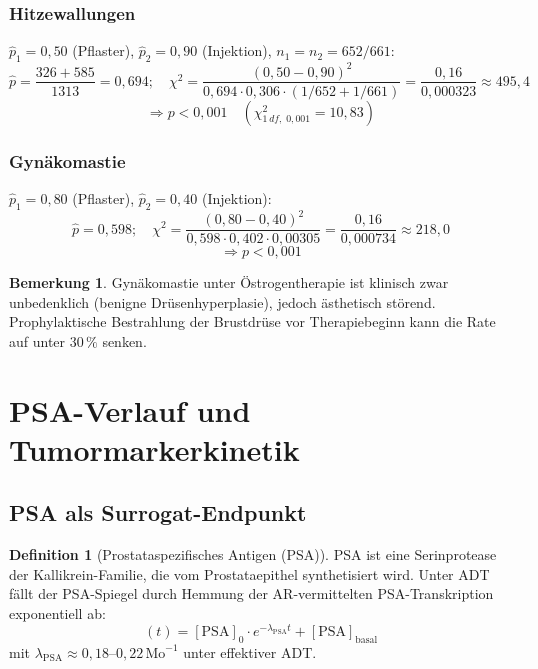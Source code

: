 ﻿\documentclass[a4paper,12pt]{article}
\theoremstyle{definition}
\newtheorem{definition}{Definition}
\newtheorem{bemerkung}{Bemerkung}
\begin{document}
\subsubsection{Hitzewallungen}

$\hat{p}_{1} = 0{,}50$ (Pflaster), $\hat{p}_{2} = 0{,}90$ (Injektion), $n_1 = n_2 = 652/661$:
\[
  \hat{p} = \frac{326 + 585}{1313} = 0{,}694; \quad
  \chi^2 = \frac{(0{,}50 - 0{,}90)^2}{0{,}694 \cdot 0{,}306 \cdot (1/652 + 1/661)}
  = \frac{0{,}16}{0{,}000323} \approx 495{,}4
\]
\[
  \Rightarrow p < 0{,}001 \quad (\chi^2_{1\,df,\;0{,}001} = 10{,}83)
\]

\subsubsection{Gynäkomastie}

$\hat{p}_{1} = 0{,}80$ (Pflaster), $\hat{p}_{2} = 0{,}40$ (Injektion):
\[
  \hat{p} = 0{,}598; \quad
  \chi^2 = \frac{(0{,}80 - 0{,}40)^2}{0{,}598 \cdot 0{,}402 \cdot 0{,}00305}
  = \frac{0{,}16}{0{,}000734} \approx 218{,}0
\]
\[
  \Rightarrow p < 0{,}001
\]

\begin{bemerkung}
Gynäkomastie unter Östrogentherapie ist klinisch zwar unbedenklich (benigne Drüsenhyperplasie), jedoch ästhetisch störend.
Prophylaktische Bestrahlung der Brustdrüse vor Therapiebeginn kann die Rate auf unter $30\,\%$ senken.
\end{bemerkung}

\section{PSA-Verlauf und Tumormarkerkinetik}

\subsection{PSA als Surrogat-Endpunkt}

\begin{definition}[Prostataspezifisches Antigen (PSA)]
PSA ist eine Serinprotease der Kallikrein-Familie, die vom Prostataepithel synthetisiert wird.
Unter ADT fällt der PSA-Spiegel durch Hemmung der AR-vermittelten PSA-Transkription exponentiell ab:
\begin{equation}
  [\mathrm{PSA}](t) = [\mathrm{PSA}]_0 \cdot e^{-\lambda_{\mathrm{PSA}} t} + [\mathrm{PSA}]_{\mathrm{basal}}
\end{equation}
mit $\lambda_{\mathrm{PSA}} \approx 0{,}18$--$0{,}22\,\text{Mo}^{-1}$ unter effektiver ADT.
\end{definition}
\end{document}
